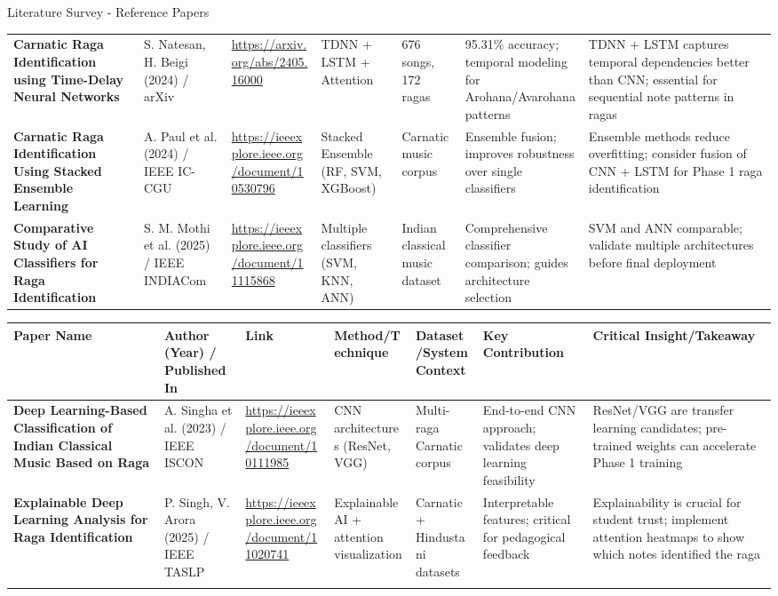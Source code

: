 \documentclass[aspectratio=169,11pt]{beamer}
\begin{document}
\begin{frame}[allowframebreaks]{Literature Survey - Reference Papers}
{\begin{longtable}{p{1.6cm}|p{1.3cm}|p{1.5cm}|p{1.6cm}|p{1.6cm}|p{1.6cm}|p{1.8cm}}
				\textbf{Carnatic Raga Identification using Time-Delay Neural Networks} & S. Natesan, H. Beigi (2024) / arXiv & \url{https://arxiv.org/abs/2405.16000} & TDNN + LSTM + Attention & 676 songs, 172 ragas & 95.31\% accuracy; temporal modeling for Arohana/Avarohana patterns & TDNN + LSTM captures temporal dependencies better than CNN; essential for sequential note patterns in ragas \\
				\addlinespace
				
				\textbf{Carnatic Raga Identification Using Stacked Ensemble Learning} & A. Paul et al. (2024) / IEEE IC-CGU & \url{https://ieeexplore.ieee.org/document/10530796} & Stacked Ensemble (RF, SVM, XGBoost) & Carnatic music corpus & Ensemble fusion; improves robustness over single classifiers & Ensemble methods reduce overfitting; consider fusion of CNN + LSTM for Phase 1 raga identification \\
				\addlinespace
				
				\textbf{Comparative Study of AI Classifiers for Raga Identification} & S. M. Mothi et al. (2025) / IEEE INDIACom & \url{https://ieeexplore.ieee.org/document/11115868} & Multiple classifiers (SVM, KNN, ANN) & Indian classical music dataset & Comprehensive classifier comparison; guides architecture selection & SVM and ANN comparable; validate multiple architectures before final deployment \\
				\bottomrule
			\end{longtable}
		}
		
		\framebreak
		
		{\tiny
			\begin{longtable}{p{1.6cm}|p{1.3cm}|p{1.5cm}|p{1.6cm}|p{1.6cm}|p{1.6cm}|p{1.8cm}}
				\toprule
				\textbf{Paper Name} & \textbf{Author (Year) / Published In} & \textbf{Link} & \textbf{Method/Technique} & \textbf{Dataset/System Context} & \textbf{Key Contribution} & \textbf{Critical Insight/Takeaway} \\
				\midrule
				
				\textbf{Deep Learning-Based Classification of Indian Classical Music Based on Raga} & A. Singha et al. (2023) / IEEE ISCON & \url{https://ieeexplore.ieee.org/document/10111985} & CNN architectures (ResNet, VGG) & Multi-raga Carnatic corpus & End-to-end CNN approach; validates deep learning feasibility & ResNet/VGG are transfer learning candidates; pre-trained weights can accelerate Phase 1 training \\
				\addlinespace
				
				\textbf{Explainable Deep Learning Analysis for Raga Identification} & P. Singh, V. Arora (2025) / IEEE TASLP & \url{https://ieeexplore.ieee.org/document/11020741} & Explainable AI + attention visualization & Carnatic + Hindustani datasets & Interpretable features; critical for pedagogical feedback & Explainability is crucial for student trust; implement attention heatmaps to show which notes identified the raga \\
				\addlinespace
				

\end{longtable}}
\end{frame}
\end{document}
